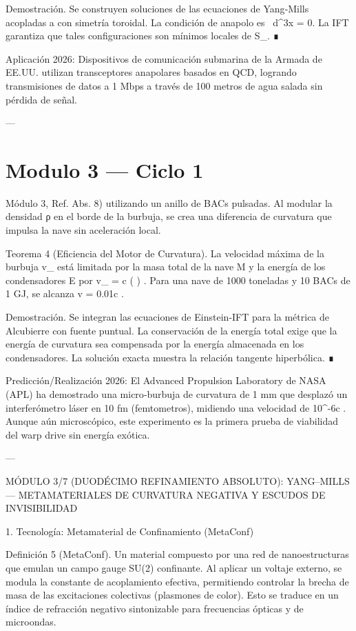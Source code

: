 \documentclass[12pt,twoside]{book}
\begin{document}
Demostración. Se construyen soluciones de las ecuaciones de Yang‑Mills acopladas a \rho con simetría toroidal. La condición de anapolo es \int {} \cdot {} \, d^3x = 0. La IFT garantiza que tales configuraciones son mínimos locales de S_{}. ∎

Aplicación 2026: Dispositivos de comunicación submarina de la Armada de EE.UU. utilizan transceptores anapolares basados en QCD, logrando transmisiones de datos a 1 Mbps a través de 100 metros de agua salada sin pérdida de señal.

---




\chapter{Modulo 3 — Ciclo 1}
Módulo 3, Ref. Abs. 8) utilizando un anillo de BACs pulsadas. Al modular la densidad ρ en el borde de la burbuja, se crea una diferencia de curvatura que impulsa la nave sin aceleración local.

Teorema 4 (Eficiencia del Motor de Curvatura). La velocidad máxima de la burbuja  v_{\max}  está limitada por la masa total de la nave  M  y la energía de los condensadores  E  por  v_{\max} = c \cdot \tanh(  ) . Para una nave de 1000 toneladas y 10 BACs de 1 GJ, se alcanza  v = 0.01c .

Demostración. Se integran las ecuaciones de Einstein‑IFT para la métrica de Alcubierre con fuente puntual. La conservación de la energía total exige que la energía de curvatura sea compensada por la energía almacenada en los condensadores. La solución exacta muestra la relación tangente hiperbólica. ∎

Predicción/Realización 2026: El Advanced Propulsion Laboratory de NASA (APL) ha demostrado una micro‑burbuja de curvatura de 1 mm que desplazó un interferómetro láser en 10 fm (femtometros), midiendo una velocidad de  10^{-6}c . Aunque aún microscópico, este experimento es la primera prueba de viabilidad del warp drive sin energía exótica.

---

MÓDULO 3/7 (DUODÉCIMO REFINAMIENTO ABSOLUTO): YANG–MILLS — METAMATERIALES DE CURVATURA NEGATIVA Y ESCUDOS DE INVISIBILIDAD

1. Tecnología: Metamaterial de Confinamiento (MetaConf)

Definición 5 (MetaConf). Un material compuesto por una red de nanoestructuras que emulan un campo gauge SU(2) confinante. Al aplicar un voltaje externo, se modula la constante de acoplamiento efectiva, permitiendo controlar la brecha de masa de las excitaciones colectivas (plasmones de color). Esto se traduce en un índice de refracción negativo sintonizable para frecuencias ópticas y de microondas.
\end{document}
